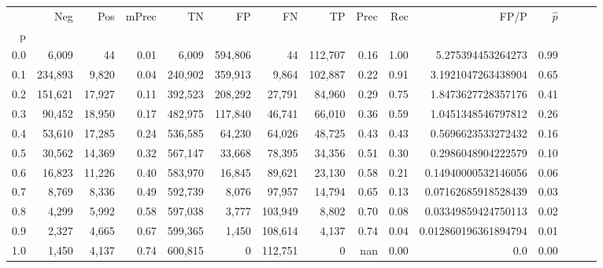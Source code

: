 \begin{tabular}{rrrrrrrrrrrrrrr}
\toprule
{} &      Neg &     Pos & mPrec &       TN &       FP &       FN &       TP &  Prec &   Rec &                  FP/P & $\hat{p}$ \\
p   &          &         &       &          &          &          &          &       &       &                       &           \\
\midrule
0.0 &    6,009 &      44 &  0.01 &    6,009 &  594,806 &       44 &  112,707 &  0.16 &  1.00 &     5.275394453264273 &      0.99 \\
0.1 &  234,893 &   9,820 &  0.04 &  240,902 &  359,913 &    9,864 &  102,887 &  0.22 &  0.91 &    3.1921047263438904 &      0.65 \\
0.2 &  151,621 &  17,927 &  0.11 &  392,523 &  208,292 &   27,791 &   84,960 &  0.29 &  0.75 &    1.8473627728357176 &      0.41 \\
0.3 &   90,452 &  18,950 &  0.17 &  482,975 &  117,840 &   46,741 &   66,010 &  0.36 &  0.59 &    1.0451348546797812 &      0.26 \\
0.4 &   53,610 &  17,285 &  0.24 &  536,585 &   64,230 &   64,026 &   48,725 &  0.43 &  0.43 &    0.5696623533272432 &      0.16 \\
0.5 &   30,562 &  14,369 &  0.32 &  567,147 &   33,668 &   78,395 &   34,356 &  0.51 &  0.30 &    0.2986048904222579 &      0.10 \\
0.6 &   16,823 &  11,226 &  0.40 &  583,970 &   16,845 &   89,621 &   23,130 &  0.58 &  0.21 &   0.14940000532146056 &      0.06 \\
0.7 &    8,769 &   8,336 &  0.49 &  592,739 &    8,076 &   97,957 &   14,794 &  0.65 &  0.13 &   0.07162685918528439 &      0.03 \\
0.8 &    4,299 &   5,992 &  0.58 &  597,038 &    3,777 &  103,949 &    8,802 &  0.70 &  0.08 &   0.03349859424750113 &      0.02 \\
0.9 &    2,327 &   4,665 &  0.67 &  599,365 &    1,450 &  108,614 &    4,137 &  0.74 &  0.04 &  0.012860196361894794 &      0.01 \\
1.0 &    1,450 &   4,137 &  0.74 &  600,815 &        0 &  112,751 &        0 &   nan &  0.00 &                   0.0 &      0.00 \\
\bottomrule
\end{tabular}
